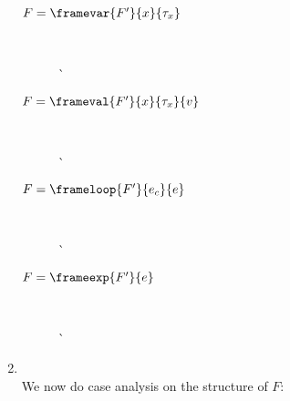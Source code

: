 \begin{enumerate}
  \begin{description}
  \item[$F=\framevar{F'}{x}{\tau_x}$] \ \\
    \begin{tabbing}
      \`  \\
    \end{tabbing}
  \item[$F=\frameval{F'}{x}{\tau_x}{v}$] \ \\
    \begin{tabbing}
      \`  \\
    \end{tabbing}
  \item[$F=\frameloop{F'}{e_c}{e}$] \ \\
    \begin{tabbing}
      \`  \\
    \end{tabbing}
  \item[$F=\frameexp{F'}{e}$] \ \\
    \begin{tabbing}
      \`  \\
    \end{tabbing}
  \end{description}

\item {} \ \\

  We now do case analysis on the structure of $F$:


\end{enumerate}
